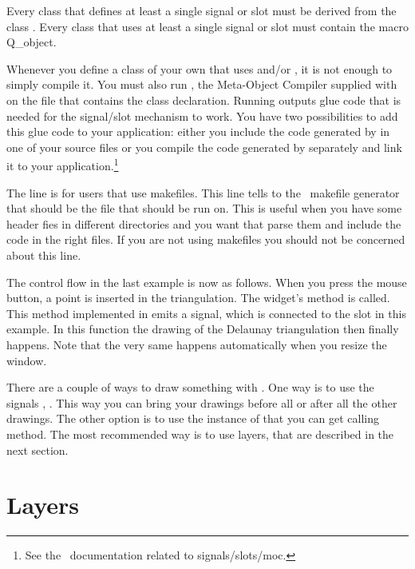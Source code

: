 Every class that defines at least a single signal or slot must 
be derived from the class . Every class that uses at
least a single signal or slot must contain the macro {\sc Q\_object}.

Whenever you define a class of your own that uses  and/or
, it is not enough to simply compile it. You must also run
, the Meta-Object Compiler supplied with \cgalqt\, on the file
that contains the class declaration. Running  outputs glue code that
is needed for the signal/slot mechanism to work. You have two
possibilities to add this glue code to your application: either you
include the code generated by  in one of your source files or 
you compile the code generated by  separately and link it to your
application.\footnote{See the \cgalqt\ documentation related to signals/slots/moc.}

The line  is for users that use
makefiles. This line tells to the \cgal\ makefile generator that
 should be the file that  should be run on.
 This is useful when you
have some header fies in different directories and you want that
 parse them and include the code in the right files. If you
are not using makefiles you should not be concerned about this line.

The control flow in the last example is now as follows. When you press the
mouse button, a point is inserted in the triangulation.  The widget's
method  is called. This method implemented in
 emits a signal, which is connected to the slot 
 in this example. In this
function the drawing of the Delaunay triangulation then finally
happens.  Note that the very same happens automatically when you
resize the window.

\begin{ccAdvanced}
There are a couple of ways to draw something with . One way
is to use the signals , .
This way you can bring your drawings before all or after all the
other drawings. The other option is to use the  instance 
of  that you can get calling 
method. The most recommended way is to use layers, that are described
in the next section.
\end{ccAdvanced}

\section{Layers}
\label{Qt_widget_layers}
